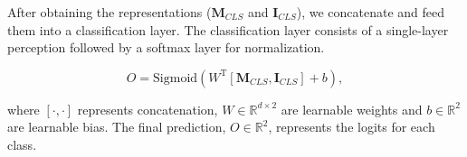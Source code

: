 




After obtaining the representations ($\mathbf{M}_{CLS}$ and $\mathbf{I}_{CLS}$), we concatenate and feed them into a classification layer. The classification layer consists of a single-layer perception followed by a softmax layer for normalization.

\begin{equation}
    \nonumber
    O = \text{Sigmoid}(W^\text{T}[\mathbf{M}_{CLS}, \mathbf{I}_{CLS}]+ b),
\end{equation}

where $[\cdot, \cdot]$ represents concatenation, $W \in \mathbb{R}^{d \times 2}$ are learnable weights and $b \in \mathbb{R}^{2}$ are learnable bias. The final prediction, $O \in \mathbb{R}^{2}$, represents the logits for each class.
